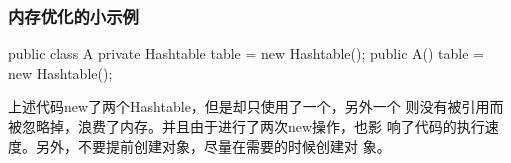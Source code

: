 \begin{frame}[fragile] %
  \frametitle{内存优化的小示例}

  \begin{javaCode}
    public class A { 
      private Hashtable table = new Hashtable(); 
      public A() { 
        table = new Hashtable();
      }
    }
  \end{javaCode}

  \pause

  {\small\kai 上述代码new了两个Hashtable，但是却只使用了一个，另外一个
    则没有被引用而被忽略掉，浪费了内存。并且由于进行了两次new操作，也影
    响了代码的执行速度。另外，不要提前创建对象，尽量在需要的时候创建对
    象。}
\end{frame}




